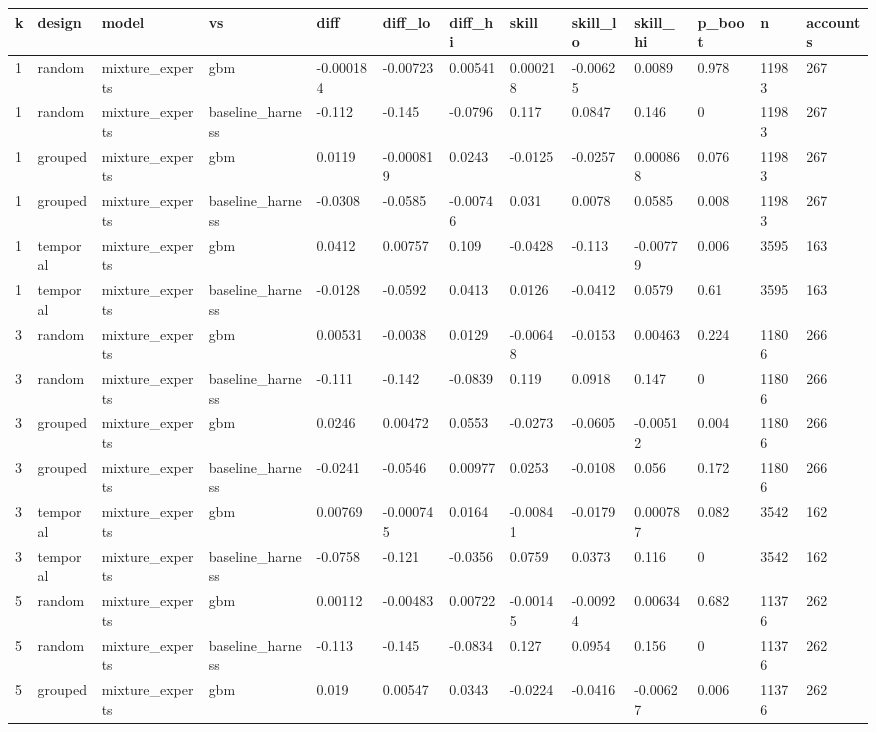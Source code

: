 \begin{tabular}{lllllllllllll}
\toprule
k & design & model & vs & diff & diff\_lo & diff\_hi & skill & skill\_lo & skill\_hi & p\_boot & n & accounts \\
\midrule
1 & random & mixture\_experts & gbm & -0.000184 & -0.00723 & 0.00541 & 0.000218 & -0.00625 & 0.0089 & 0.978 & 11983 & 267 \\
1 & random & mixture\_experts & baseline\_harness & -0.112 & -0.145 & -0.0796 & 0.117 & 0.0847 & 0.146 & 0 & 11983 & 267 \\
1 & grouped & mixture\_experts & gbm & 0.0119 & -0.000819 & 0.0243 & -0.0125 & -0.0257 & 0.000868 & 0.076 & 11983 & 267 \\
1 & grouped & mixture\_experts & baseline\_harness & -0.0308 & -0.0585 & -0.00746 & 0.031 & 0.0078 & 0.0585 & 0.008 & 11983 & 267 \\
1 & temporal & mixture\_experts & gbm & 0.0412 & 0.00757 & 0.109 & -0.0428 & -0.113 & -0.00779 & 0.006 & 3595 & 163 \\
1 & temporal & mixture\_experts & baseline\_harness & -0.0128 & -0.0592 & 0.0413 & 0.0126 & -0.0412 & 0.0579 & 0.61 & 3595 & 163 \\
3 & random & mixture\_experts & gbm & 0.00531 & -0.0038 & 0.0129 & -0.00648 & -0.0153 & 0.00463 & 0.224 & 11806 & 266 \\
3 & random & mixture\_experts & baseline\_harness & -0.111 & -0.142 & -0.0839 & 0.119 & 0.0918 & 0.147 & 0 & 11806 & 266 \\
3 & grouped & mixture\_experts & gbm & 0.0246 & 0.00472 & 0.0553 & -0.0273 & -0.0605 & -0.00512 & 0.004 & 11806 & 266 \\
3 & grouped & mixture\_experts & baseline\_harness & -0.0241 & -0.0546 & 0.00977 & 0.0253 & -0.0108 & 0.056 & 0.172 & 11806 & 266 \\
3 & temporal & mixture\_experts & gbm & 0.00769 & -0.000745 & 0.0164 & -0.00841 & -0.0179 & 0.000787 & 0.082 & 3542 & 162 \\
3 & temporal & mixture\_experts & baseline\_harness & -0.0758 & -0.121 & -0.0356 & 0.0759 & 0.0373 & 0.116 & 0 & 3542 & 162 \\
5 & random & mixture\_experts & gbm & 0.00112 & -0.00483 & 0.00722 & -0.00145 & -0.00924 & 0.00634 & 0.682 & 11376 & 262 \\
5 & random & mixture\_experts & baseline\_harness & -0.113 & -0.145 & -0.0834 & 0.127 & 0.0954 & 0.156 & 0 & 11376 & 262 \\
5 & grouped & mixture\_experts & gbm & 0.019 & 0.00547 & 0.0343 & -0.0224 & -0.0416 & -0.00627 & 0.006 & 11376 & 262 \\

\end{tabular}
